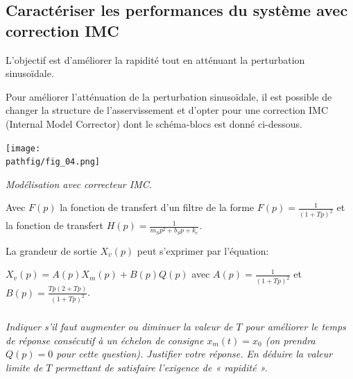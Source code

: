 \documentclass[10pt,fleqn]{article} %
\begin{document}
\subsection{Caractériser les performances du système avec correction IMC}

L'objectif est d'améliorer la rapidité tout en atténuant la perturbation sinusoïdale.


Pour améliorer l'atténuation de la perturbation sinusoïdale, il est possible de changer la
structure de l'asservissement et d'opter pour une correction IMC (Internal Model Corrector)
dont le schéma-blocs est donné ci-dessous.%

\begin{center}%
\texttt{[image: \\pathfig/fig\_04.png]}

%
%
%
%

\textit{Modélisation avec correcteur IMC.
\label{chap2:tele:20}}
\end{center}


Avec $F(p)$ la fonction de transfert d'un filtre de la forme $F(p)=\frac{1}{(1+T p)^2}$ et la fonction de transfert $H(p)= \frac{1}{m_S p^2 + b_S p + k_e}$.

La grandeur de sortie $X_v(p)$ peut s'exprimer par l'équation:

$X_v(p)=A(p) X_m(p) + B(p) Q(p)$ avec $A(p)=\frac{1}{(1+T p)^2}$ et $B(p)=\frac{T p (2 + T p)}{(1+T p)^2}$.



\subparagraph{}\textit{Indiquer s'il faut augmenter ou diminuer la valeur de $T$ pour améliorer le temps de réponse
consécutif à un échelon de consigne $x_m(t) = x_0$ (on prendra $Q(p) = 0$ pour cette question).
Justifier votre réponse. En déduire la valeur limite de $T$ permettant de satisfaire l'exigence de
« rapidité ».}
\end{document}
